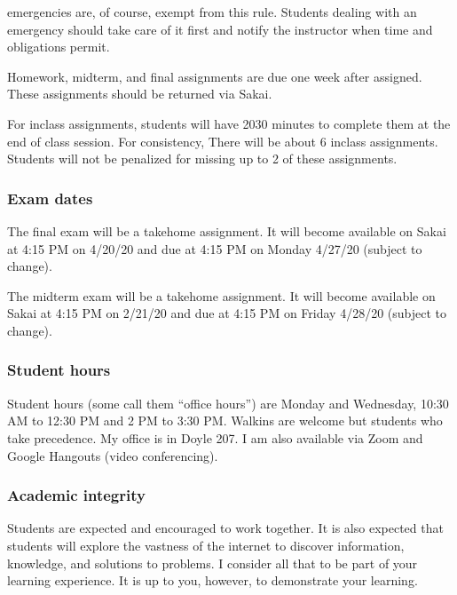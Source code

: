 \documentclass[letterpaper,10pt,english]{sphinxmanual}
\begin{document}
 emergencies are, of course, exempt from this rule. Students dealing with an emergency should take care of it first and notify the instructor when time and obligations permit.

Homework, midterm, and final assignments are due one week after assigned. These assignments should be returned via Sakai.

For in\sphinxhyphen{}class assignments, students will have 20\sphinxhyphen{}30 minutes to complete them at the end of class session. For consistency,  There will be about 6 in\sphinxhyphen{}class assignments. Students will not be penalized for missing up to 2 of these assignments.


\subsubsection{Exam dates}
\label{\detokenize{COMP271/organization:exam-dates}}
The final exam will be a take\sphinxhyphen{}home assignment. It will become available on Sakai at 4:15 PM on 4/20/20 and due at 4:15 PM on Monday 4/27/20 (subject to change).

The midterm exam will be a take\sphinxhyphen{}home assignment. It will become available on Sakai at 4:15 PM on 2/21/20 and due at 4:15 PM on Friday 4/28/20 (subject to change).


\subsubsection{Student hours}
\label{\detokenize{COMP271/organization:student-hours}}
Student hours (some call them “office hours”) are Monday and Wednesday, 10:30 AM to 12:30 PM and 2 PM to 3:30 PM. Walk\sphinxhyphen{}ins are welcome but students who   take precedence. My office is in Doyle 207. I am also available via Zoom and Google Hangouts (video conferencing).


\subsubsection{Academic integrity}
\label{\detokenize{COMP271/organization:academic-integrity}}
Students are expected and encouraged to work together. It is also expected that students will explore the vastness of the internet to discover information, knowledge, and solutions to problems. I consider all that to be part of your learning experience. It is up to you, however, to demonstrate your learning.
\end{document}
